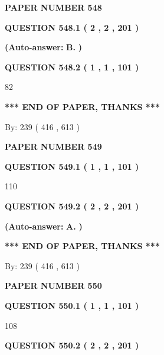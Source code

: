 \documentclass[12pt]{article}
\begin{document}
   
\newpage 
\setcounter{page}{ 
   548001 } 
   
   
 {\textbf{ \Large{ PAPER NUMBER  548  }}}
   
   
   
   
  
  
{\textbf{\large{QUESTION
548.1 
 ( 2 , 2 , 201 )
}}}
 
 
{\textbf{(Auto-answer:}}
{\textbf{\large{
B.}}}
{\textbf{)}}
 
 
  
  
{\textbf{\large{QUESTION
548.2 
 ( 1 , 1 , 101 )
}}}

82
   
   
   
   
\vspace{1.0in} 
{\textbf{\large{ *** END OF PAPER, THANKS *** }}} 
   
   
\hspace{1.0in} By: 
 239 ( 416 ,  613 )
   
   
   
   
\newpage 
\setcounter{page}{ 
   549001 } 
   
   
 {\textbf{ \Large{ PAPER NUMBER  549  }}}
   
   
   
   
  
  
{\textbf{\large{QUESTION
549.1 
 ( 1 , 1 , 101 )
}}}

110
  
  
{\textbf{\large{QUESTION
549.2 
 ( 2 , 2 , 201 )
}}}
 
 
{\textbf{(Auto-answer:}}
{\textbf{\large{
A.}}}
{\textbf{)}}
 
 
   
   
   
   
\vspace{1.0in} 
{\textbf{\large{ *** END OF PAPER, THANKS *** }}} 
   
   
\hspace{1.0in} By: 
 239 ( 416 ,  613 )
   
   
   
   
\newpage 
\setcounter{page}{ 
   550001 } 
   
   
 {\textbf{ \Large{ PAPER NUMBER  550  }}}
   
   
   
   
  
  
{\textbf{\large{QUESTION
550.1 
 ( 1 , 1 , 101 )
}}}

108
  
  
{\textbf{\large{QUESTION
550.2 
 ( 2 , 2 , 201 )
}}}
 
\end{document}

